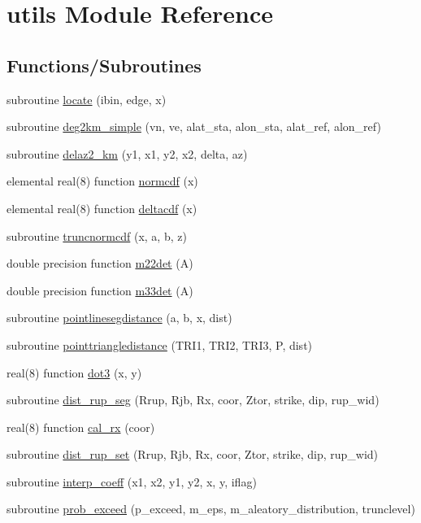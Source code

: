\hypertarget{namespaceutils}{}\section{utils Module Reference}
\label{namespaceutils}
\subsection*{Functions/\+Subroutines}
\begin{DoxyCompactItemize}
\item 
subroutine \hyperlink{namespaceutils_a6c61290deedf912e6810628145911f85}{locate} (ibin, edge, x)
\item 
subroutine \hyperlink{namespaceutils_aa0f32919ddbbde1b5238425529660459}{deg2km\+\_\+simple} (vn, ve, alat\+\_\+sta, alon\+\_\+sta,                                           alat\+\_\+ref, alon\+\_\+ref)
\item 
subroutine \hyperlink{namespaceutils_aa1dce66e1b3b67f4ff37fa7a949cb7b4}{delaz2\+\_\+km} (y1, x1, y2, x2, delta, az)
\item 
elemental real(8) function \hyperlink{namespaceutils_aa41cc7594a2b7ecd3f3931859172f175}{normcdf} (x)
\item 
elemental real(8) function \hyperlink{namespaceutils_a568d3767bca697c86b861637a25888f8}{deltacdf} (x)
\item 
subroutine \hyperlink{namespaceutils_ac313e8810c0e461aa91b7299c8fba4be}{truncnormcdf} (x, a, b, z)
\item 
double precision function \hyperlink{namespaceutils_a64e66c94f05898717cbc1863f70c9be1}{m22det} (A)
\item 
double precision function \hyperlink{namespaceutils_a9bad87c0b79a45b5c6e6bbfcb2c6a126}{m33det} (A)
\item 
subroutine \hyperlink{namespaceutils_aa037ebfaff3336105e73f563fdab02a8}{pointlinesegdistance} (a, b, x, dist)
\item 
subroutine \hyperlink{namespaceutils_aebfee5643eb6828d1b6fd64229189af0}{pointtriangledistance} (T\+R\+I1, T\+R\+I2, T\+R\+I3, P, dist)
\item 
real(8) function \hyperlink{namespaceutils_ab5a1a9ca34591c37c7fb606189317e16}{dot3} (x, y)
\item 
subroutine \hyperlink{namespaceutils_af6906785e7d185fbdf7034969aababc4}{dist\+\_\+rup\+\_\+seg} (Rrup, Rjb, Rx, coor, Ztor, strike, dip, rup\+\_\+wid)
\item 
real(8) function \hyperlink{namespaceutils_aa1727e2ba89368130186d248fd7b71b4}{cal\+\_\+rx} (coor)
\item 
subroutine \hyperlink{namespaceutils_a3dfc1e25be8aa02534fda1a437ec9855}{dist\+\_\+rup\+\_\+set} (Rrup, Rjb, Rx, coor, Ztor, strike, dip, rup\+\_\+wid)
\item 
subroutine \hyperlink{namespaceutils_ae3d121578601cfdb0b2687656ea19761}{interp\+\_\+coeff} (x1, x2, y1, y2, x, y, iflag)
\item 
subroutine \hyperlink{namespaceutils_a47c34e02c3a6ca718ff160f085117f47}{prob\+\_\+exceed} (p\+\_\+exceed, m\+\_\+eps, m\+\_\+aleatory\+\_\+distribution, trunclevel)
\end{DoxyCompactItemize}


